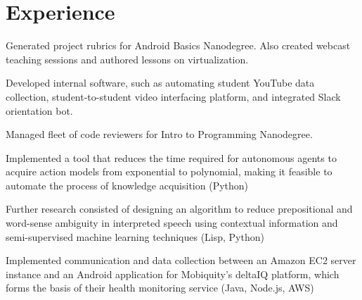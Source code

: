 \documentclass[]{deedy-resume-openfont}
\begin{document}
\hfill
\begin{minipage}[t]{0.66\textwidth} 


\section{Experience}

\vspace{\topsep} %
\begin{tightemize}
\item Generated project rubrics for Android Basics Nanodegree. Also created webcast teaching sessions and authored lessons on virtualization.
\item Developed internal software, such as automating student YouTube data collection, student-to-student video interfacing platform, and integrated Slack orientation bot.
\item Managed fleet of code reviewers for Intro to Programming Nanodegree.
\end{tightemize}
\sectionsep

\begin{tightemize}
\item Implemented a tool that reduces the time required for autonomous agents to acquire action models from exponential to polynomial, making it feasible to automate the process of knowledge acquisition (Python)

\item Further research consisted of designing an algorithm to reduce prepositional and word-sense ambiguity in interpreted speech using contextual information and semi-supervised machine learning techniques (Lisp, Python)
\end{tightemize}
\sectionsep

\begin{tightemize}
\item Implemented communication and data collection between an Amazon EC2 server instance and an Android application for Mobiquity’s deltaIQ platform, which forms the basis of their health monitoring service (Java, Node.js, AWS)


\end{tightemize}
\end{minipage}
\end{document}
